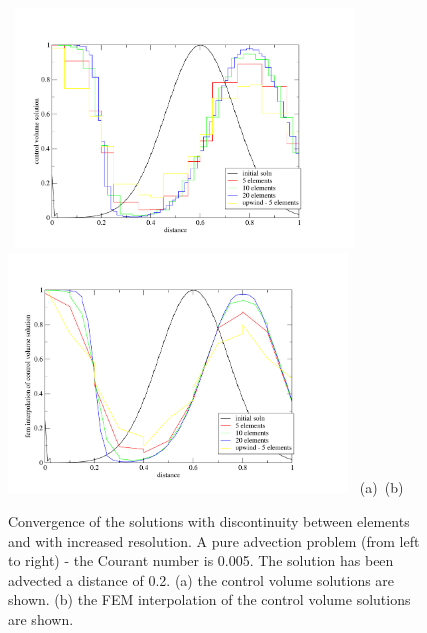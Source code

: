 \begin{figure}[H]
\vbox{
\hbox{
\hspace{-1.cm}
\includegraphics[width=9.0cm,height=9.cm]{./doc_figures/converg-cv}
\hspace{-1.cm}
\includegraphics[width=9.0cm,height=9.cm]{./doc_figures/converg-fem}
}
\vspace{-0.cm}
\hbox{\hspace{4.cm}(a) \hspace{6.5cm}(b)}
\vspace{-0.cm}}
\label{converg}
\caption{Convergence of the solutions with discontinuity between elements and with increased resolution. A pure advection problem (from left to right) - the Courant number  
is 0.005. The solution has been advected a distance of 0.2. (a) the control volume solutions are shown. (b) the FEM interpolation of the control volume solutions are shown. }
\end{figure}


